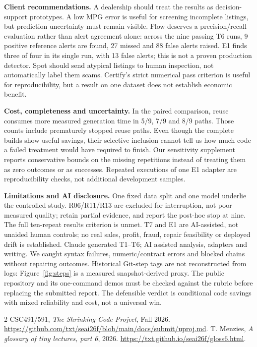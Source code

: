 \documentclass[sigconf,nonacm]{acmart}
\begin{document}
\textbf{Client recommendations.} A dealership should treat the results as decision-support prototypes. A low MPG error is useful for screening incomplete listings, but prediction uncertainty must remain visible. Flow deserves a precision/recall evaluation rather than alert agreement alone: across the nine passing T6 runs, 9 positive reference alerts are found, 27 missed and 88 false alerts raised. E1 finds three of four in its single run, with 13 false alerts; this is not a proven production detector. Spot should send atypical listings to human inspection, not automatically label them scams. Certify's strict numerical pass criterion is useful for reproducibility, but a result on one dataset does not establish economic benefit. 

\textbf{Cost, completeness and uncertainty.} In the paired comparison, reuse consumes more measured generation time in 5/9, 7/9 and 8/9 paths. Those counts include prematurely stopped reuse paths. Even though the complete builds show useful savings, their selective inclusion cannot tell us how much code a failed treatment would have required to finish. Our sensitivity supplement reports conservative bounds on the missing repetitions instead of treating them as zero outcomes or as successes. Repeated executions of one E1 adapter are reproducibility checks, not additional development samples.

\textbf{Limitations and AI disclosure.} One fixed data split and one model underlie the controlled study. R06/R11/R13 are excluded for interruption, not poor measured quality; retain partial evidence, and report the post-hoc stop at nine. The full ten-repeat results criterion is unmet. T7 and E1 are AI-assisted, not unaided human controls; no real sales, profit, fraud, repair feasibility or deployed drift is established. Claude generated T1--T6; AI assisted analysis, adapters and writing. We caught syntax failures, numeric/contract errors and blocked chains without repairing outcomes. Historical Git-step tags are not reconstructed from logs: Figure~\ref{fig:steps} is a measured snapshot-derived proxy. The public repository and its one-command demos must be checked against the rubric before replacing the submitted report. The defensible verdict is conditional code savings with mixed reliability and cost, not a universal win.
\balance
\begin{thebibliography}{2}
 CSC491/591, \emph{The Shrinking-Code Project}, Fall 2026. \url{https://github.com/txt/seai26f/blob/main/docs/submit/uproj.md}.
 T. Menzies, \emph{A glossary of tiny lectures, part 6}, 2026. \url{https://txt.github.io/seai26f/gloss6.html}.
\end{thebibliography}
\end{document}
